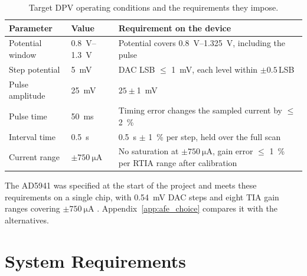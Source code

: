 \begin{table}[H]
  \centering
  \caption{Target DPV operating conditions and the requirements they impose.}
  \label{tab:req_dpv}
  \begin{tabularx}{\textwidth}{@{}l l >{\raggedright\arraybackslash}X@{}}
    \toprule
    \textbf{Parameter} & \textbf{Value} & \textbf{Requirement on the device} \\
    \midrule
    Potential window  & \SIrange{0.8}{1.3}{\volt} &
      Potential covers \SIrange{0.8}{1.325}{\volt}, including the pulse \\
    Step potential    & \SI{5}{\milli\volt} &
      DAC LSB $\leq$ \SI{1}{\milli\volt}, each level within
      $\pm 0.5$\,LSB  \\
    Pulse amplitude   & \SI{25}{\milli\volt} &
      $25\pm$\SI{1}{\milli\volt} \\
    Pulse time        & \SI{50}{\milli\second} &
      Timing error changes the sampled current by $\leq$ \SI{2}{\percent} \\
    Interval time     & \SI{0.5}{\second} &
      \SI{0.5}{\second} $\pm$ \SI{1}{\percent} per step, held over the full scan \\
    \midrule
    Current range     & $\pm\SI{750}{\micro\ampere}$ &
      No saturation at $\pm\SI{750}{\micro\ampere}$, gain error
      $\leq$ \SI{1}{\percent} per RTIA range after calibration \\
    \bottomrule
  \end{tabularx}
\end{table}

The AD5941 was specified at the start of the project and meets these requirements on a single chip, with \SI{0.54}{\milli\volt} DAC steps and eight TIA gain ranges covering $\pm\SI{750}{\micro\ampere}$ \cite{ad5941_ds}. Appendix~\ref{app:afe_choice} compares it with the alternatives.

\section{System Requirements}

